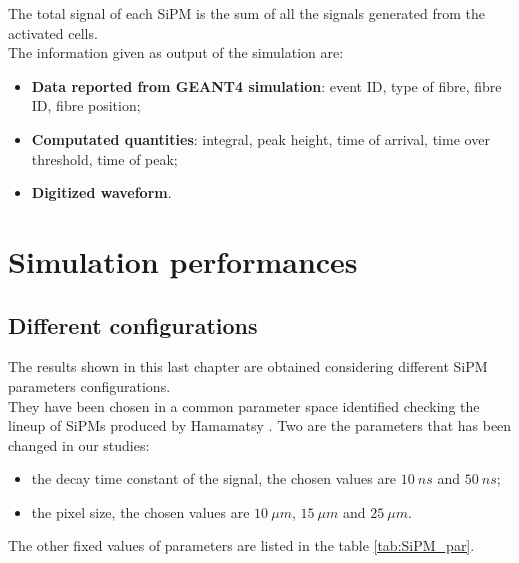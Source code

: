 The total signal of each SiPM is the sum of all the signals generated from the activated cells.\\

The information given as output of the simulation are:
\begin{itemize}
	\item \textbf{Data reported from GEANT4 simulation}: event ID, type of fibre, fibre ID, fibre position;
	\item \textbf{Computated quantities}: integral, peak height, time of arrival, time over threshold, time of peak;
	\item \textbf{Digitized waveform}.
\end{itemize}

\section{Simulation performances} \label{sec:Sim_perf}

\subsection{Different configurations} \label{subsec:SiPM_conf}
The results shown in this last chapter are obtained considering different SiPM parameters configurations.\\
They have been chosen in a common parameter space identified checking the lineup of SiPMs produced by Hamamatsy \cite{SiPM_lineup}. 
Two are the parameters that has been changed in our studies: 
\begin{itemize}
	\item the decay time constant of the signal, the chosen values are $10\ ns$ and $50\ ns$;
	\item the pixel size, the chosen values are $10\ \mu m$, $15\ \mu m$ and $25\ \mu m$.
\end{itemize}

The other fixed values of parameters are listed in the table \ref{tab:SiPM_par}.\\

